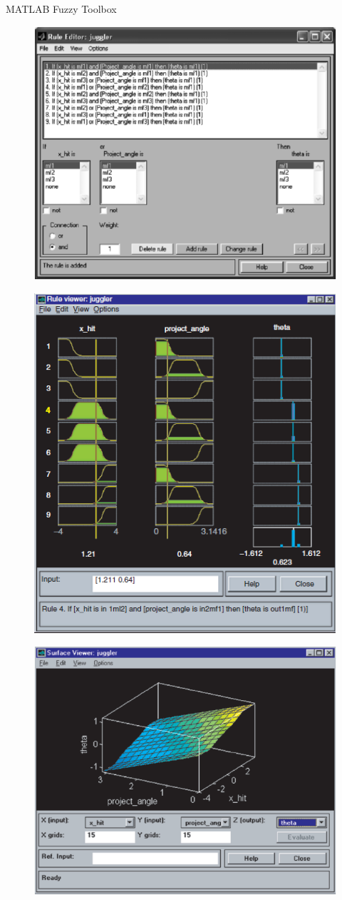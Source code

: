\documentclass[hyperref={unicode}]{beamer}
\begin{document}
\begin{frame}[allowframebreaks]{MATLAB Fuzzy Toolbox}
\begin{figure}
	\end{figure}
	\begin{figure}
	\includegraphics[width=.75\textwidth]{sw-4.png}
	\end{figure}
	\begin{figure}
	\includegraphics[width=.5\textwidth]{sw-5.png}
	\end{figure}
	\begin{figure}
	\includegraphics[width=.75\textwidth]{sw-6.png}
	\end{figure}
\end{frame}
\end{document}
